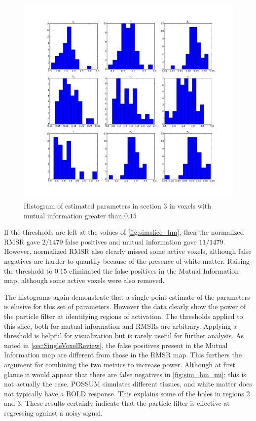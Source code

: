 \begin{figure} %
\centering
\includegraphics[clip=true,trim=2.5cm 2cm 2cm 1cm,width=\textwidth]{images/slicesim_hist3}
\caption[Histogram of estimated parameters in section 3]
{Histogram of estimated parameters in section 3 in voxels with mutual information greater
than $0.15$}
\label{fig:slicesim_hist3}
\end{figure}

If the thresholds are left at the values of \autoref{fig:simslice_hm}, then
the normalized \ac{RMSR} gave $2/1479$  false positives and mutual information gave
$11/1479$. However, normalized \ac{RMSR} also clearly missed some active voxels, although
false negatives are harder to quantify because of the presence of white matter.
Raising the threshold to $0.15$ eliminated the false positives in the
Mutual Information map, although some active voxels were also removed.

The histograms again demonstrate that a single point estimate of the parameters
is elusive for this set of parameters. However the data clearly show the power
of the particle filter at identifying regions of activation.
The thresholds applied to this slice, both for mutual information and
\acp{RMSR} are arbitrary. Applying a
threshold is helpful for visualization but is rarely useful for further analysis.
As noted in \autoref{sec:SingleVoxelReview},
the false positives present in the Mutual Information
map are different from those in the \ac{RMSR} map. This furthers the argument
for combining the two metrics to increase power. Although
at first glance it would appear that there are false negatives in
\autoref{fig:sim_hm_mi}; this is
not actually the case. \ac{POSSUM} simulates different tissues, and white matter
does not typically  have a \ac{BOLD} response. This explains some of the 
holes in regions
2 and 3. These results certainly indicate that the particle filter is effective
at regressing against a noisy signal.

